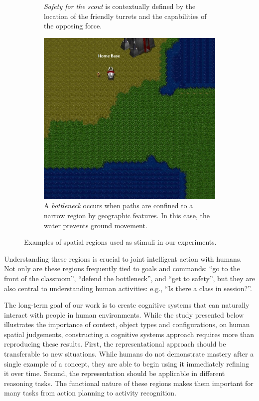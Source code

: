 \documentclass[11pt,letterpaper]{article}
\begin{document}
\begin{figure}
\begin{subfigure}[b]{0.3\textwidth}
  \caption{\textit{Safety for the scout} is contextually defined by the location of the friendly turrets and the capabilities of the opposing force.}
\end{subfigure}
\begin{subfigure}[b]{0.3\textwidth}
  \includegraphics[width=\textwidth]{figures/bottleneck.JPG}
  \caption{A \textit{bottleneck} occurs when paths are confined to a narrow region by geographic features.  In this case, the water prevents ground movement.}
  \label{fig:safety}
  \end{subfigure}
  
  \caption{Examples of spatial regions used as stimuli in our experiments.}
  \label{fig:examples}
\end{figure}

Understanding these regions is crucial to joint intelligent action with humans.  Not only are these regions frequently tied to goals and commands: ``go to the front of the classroom'', ``defend the bottleneck'', and ``get to safety'', but they are also central to understanding human activities: e.g., ``Is there a class in session?''.

The long-term goal of our work is to create cognitive systems that can naturally interact with people in human environments.  While the study presented below illustrates the importance of context, object types and configurations, on human spatial judgements, constructing a cognitive systems approach requires more than reproducing these results.  First, the representational approach should be transferable to new situations.  While humans do not demonstrate mastery after a single example of a concept, they are able to begin using it immediately refining it over time.  Second, the representation should be applicable in different reasoning tasks.  The functional nature of these regions makes them important for many tasks from action planning to activity recognition.
\end{document}
